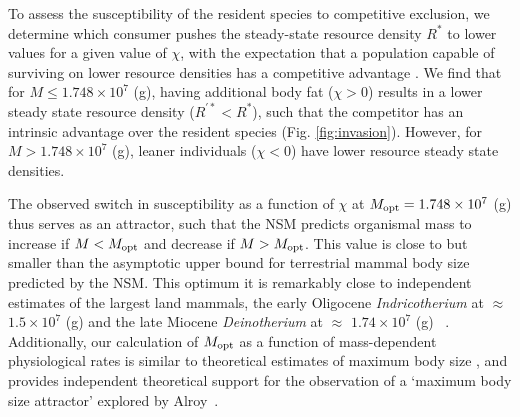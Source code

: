 \documentclass[twocolumn,preprintnumbers,amsmath,amssymb,superscriptaddress]{revtex4}
\begin{document}
To assess the susceptibility of the resident species to competitive
exclusion, we determine which consumer pushes the steady-state resource
density $R^*$ to lower values for a given value of $\chi$, with the
expectation that a population capable of surviving on lower resource
densities has a competitive advantage \citep{tilman1981}.  We find that for
$M\leq 1.748\times10^7$ (g), having additional body fat ($\chi > 0$) results
in a lower steady state resource density ($R^{\prime *}<R^*$), such that the
competitor has an intrinsic advantage over the resident species
(Fig. \ref{fig:invasion}).  However, for $M> 1.748\times10^7$ (g), leaner
individuals ($\chi < 0$) have lower resource steady state densities.


The observed switch in susceptibility as a function of $\chi$ at
$M_{\rm opt}= 1.748\times10^7$ (g) thus serves as an attractor, such that the
NSM predicts organismal mass to increase if $M<M_{\rm opt}$ and decrease if
$M>M_{\rm opt}$.  This value is close to but smaller than the asymptotic
upper bound for terrestrial mammal body size predicted by the NSM.  This
optimum it is remarkably close to independent estimates of the largest land
mammals, the early Oligocene \emph{Indricotherium} at $\approx$
$1.5\times10^7$ (g) and the late Miocene \emph{Deinotherium} at $\approx$
$1.74\times10^7$ (g) ~\citep{Smith:2010p3442}.  Additionally, our calculation
of $M_{\rm opt}$ as a function of mass-dependent physiological rates is
similar to theoretical estimates of maximum body size \citep{Clauset:2009fh},
and provides independent theoretical support for the observation of a
`maximum body size attractor' explored by Alroy~\citep{Alroy:1998p1594}.
\end{document}
